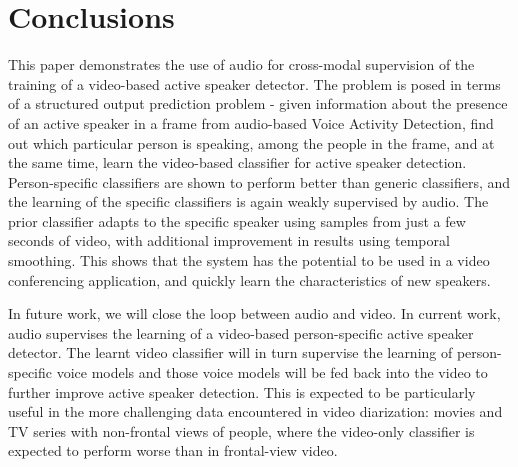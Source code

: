 \documentclass[runningheads]{llncs}
\begin{document}
\section{Conclusions}
\label{concl}
This paper demonstrates the use of audio for cross-modal supervision of the training of a video-based active speaker detector. The problem is posed in terms of a structured output prediction problem - given information about the presence of an active speaker in a frame from audio-based Voice Activity Detection, find out which particular person is speaking, among the people in the frame, and at the same time, learn the video-based classifier for active speaker detection. Person-specific classifiers are shown to perform better than generic classifiers, and the learning of the specific classifiers is again weakly supervised by audio. 
The prior classifier adapts to the specific speaker using samples from just a few seconds of video, with additional improvement in results using temporal smoothing. This shows that the system has the potential to be used in a video conferencing application, and quickly learn the characteristics of new speakers.

In future work, we will close the loop between audio and video. In current work, audio supervises the learning of a video-based person-specific active speaker detector. The learnt video classifier will in turn supervise the learning of person-specific voice models and those voice models will be fed back into the video to further improve active speaker detection. This is expected to be particularly useful in the more challenging data encountered in video diarization: movies and TV series with non-frontal views of people, where the video-only classifier is expected to perform worse than in frontal-view video.

\clearpage


{}
\end{document}
